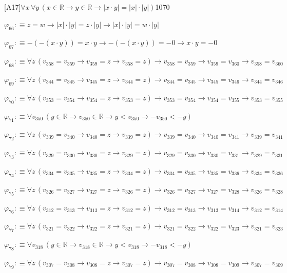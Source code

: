 \begin{fullproof}{[A17]}{$\forall x\,\forall y\,(x \in \mathbb{R} \to y \in \mathbb{R} \to \lvert x \cdot y \rvert = \lvert x \rvert \cdot \lvert y \rvert)$}{1070}
\begin{abbrevlist}
\item $\varphi_{66} :\equiv z = w \to \lvert x \rvert \cdot \lvert y \rvert = z \cdot \lvert y \rvert \to \lvert x \rvert \cdot \lvert y \rvert = w \cdot \lvert y \rvert$
\item $\varphi_{67} :\equiv -(-(x \cdot y)) = x \cdot y \to -(-(x \cdot y)) = -0 \to x \cdot y = -0$
\item $\varphi_{68} :\equiv \forall z\,(v_{358} = v_{359} \to v_{359} = z \to v_{358} = z) \to v_{358} = v_{359} \to v_{359} = v_{360} \to v_{358} = v_{360}$
\item $\varphi_{69} :\equiv \forall z\,(v_{344} = v_{345} \to v_{345} = z \to v_{344} = z) \to v_{344} = v_{345} \to v_{345} = v_{346} \to v_{344} = v_{346}$
\item $\varphi_{70} :\equiv \forall z\,(v_{353} = v_{354} \to v_{354} = z \to v_{353} = z) \to v_{353} = v_{354} \to v_{354} = v_{355} \to v_{353} = v_{355}$
\item $\varphi_{71} :\equiv \forall v_{350}\,(y \in \mathbb{R} \to v_{350} \in \mathbb{R} \to y < v_{350} \to -v_{350} < -y)$
\item $\varphi_{72} :\equiv \forall z\,(v_{339} = v_{340} \to v_{340} = z \to v_{339} = z) \to v_{339} = v_{340} \to v_{340} = v_{341} \to v_{339} = v_{341}$
\item $\varphi_{73} :\equiv \forall z\,(v_{329} = v_{330} \to v_{330} = z \to v_{329} = z) \to v_{329} = v_{330} \to v_{330} = v_{331} \to v_{329} = v_{331}$
\item $\varphi_{74} :\equiv \forall z\,(v_{334} = v_{335} \to v_{335} = z \to v_{334} = z) \to v_{334} = v_{335} \to v_{335} = v_{336} \to v_{334} = v_{336}$
\item $\varphi_{75} :\equiv \forall z\,(v_{326} = v_{327} \to v_{327} = z \to v_{326} = z) \to v_{326} = v_{327} \to v_{327} = v_{328} \to v_{326} = v_{328}$
\item $\varphi_{76} :\equiv \forall z\,(v_{312} = v_{313} \to v_{313} = z \to v_{312} = z) \to v_{312} = v_{313} \to v_{313} = v_{314} \to v_{312} = v_{314}$
\item $\varphi_{77} :\equiv \forall z\,(v_{321} = v_{322} \to v_{322} = z \to v_{321} = z) \to v_{321} = v_{322} \to v_{322} = v_{323} \to v_{321} = v_{323}$
\item $\varphi_{78} :\equiv \forall v_{318}\,(y \in \mathbb{R} \to v_{318} \in \mathbb{R} \to y < v_{318} \to -v_{318} < -y)$
\item $\varphi_{79} :\equiv \forall z\,(v_{307} = v_{308} \to v_{308} = z \to v_{307} = z) \to v_{307} = v_{308} \to v_{308} = v_{309} \to v_{307} = v_{309}$

\end{abbrevlist}
\end{fullproof}
